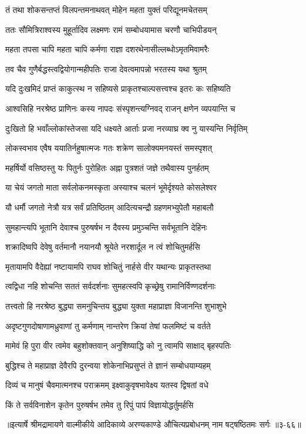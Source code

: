 
\twolineshloka
{तं तथा शोकसन्तप्तं विलपन्तमनाथवत्}
{मोहेन महता युक्तं परिद्यूनमचेतसम्} %

\twolineshloka
{ततः सौमित्रिराश्वस्य मुहूर्तादिव लक्ष्मणः}
{रामं सम्बोधयामास चरणौ चाभिपीडयन्} %

\twolineshloka
{महता तपसा चापि महता चापि कर्मणा}
{राज्ञा दशरथेनासील्लब्धोऽमृतमिवामरैः} %

\twolineshloka
{तव चैव गुणैर्बद्धस्त्वद्वियोगान्महीपतिः}
{राजा देवत्वमापन्नो भरतस्य यथा श्रुतम्} %

\twolineshloka
{यदि दुःखमिदं प्राप्तं काकुत्स्थ न सहिष्यसे}
{प्राकृतश्चाल्पसत्त्वश्च इतरः कः सहिष्यति} %

\twolineshloka
{आश्वसिहि नरश्रेष्ठ प्राणिनः कस्य नापदः}
{संस्पृशन्त्यग्निवद् राजन् क्षणेन व्यपयान्ति च} %

\twolineshloka
{दुःखितो हि भवाँल्लोकांस्तेजसा यदि धक्ष्यते}
{आर्ताः प्रजा नरव्याघ्र क्व नु यास्यन्ति निर्वृतिम्} %

\twolineshloka
{लोकस्वभाव एवैष ययातिर्नहुषात्मजः}
{गतः शक्रेण सालोक्यमनयस्तं समस्पृशत्} %

\twolineshloka
{महर्षिर्यो वसिष्ठस्तु यः पितुर्नः पुरोहितः}
{अह्ना पुत्रशतं जज्ञे तथैवास्य पुनर्हतम्} %

\twolineshloka
{या चेयं जगतो माता सर्वलोकनमस्कृता}
{अस्याश्च चलनं भूमेर्दृश्यते कोसलेश्वर} %

\twolineshloka
{यौ धर्मौ जगतो नेत्रौ यत्र सर्वं प्रतिष्ठितम्}
{आदित्यचन्द्रौ ग्रहणमभ्युपेतौ महाबलौ} %

\twolineshloka
{सुमहान्त्यपि भूतानि देवाश्च पुरुषर्षभ}
{न दैवस्य प्रमुञ्चन्ति सर्वभूतानि देहिनः} %

\twolineshloka
{शक्रादिष्वपि देवेषु वर्तमानौ नयानयौ}
{श्रूयेते नरशार्दूल न त्वं शोचितुमर्हसि} %

\twolineshloka
{मृतायामपि वैदेह्यां नष्टायामपि राघव}
{शोचितुं नार्हसे वीर यथान्यः प्राकृतस्तथा} %

\twolineshloka
{त्वद्विधा नहि शोचन्ति सततं सर्वदर्शनाः}
{सुमहत्स्वपि कृच्छ्रेषु रामानिर्विण्णदर्शनाः} %

\twolineshloka
{तत्त्वतो हि नरश्रेष्ठ बुद्ध्या समनुचिन्तय}
{बुद्ध्या युक्ता महाप्राज्ञा विजानन्ति शुभाशुभे} %

\twolineshloka
{अदृष्टगुणदोषाणामध्रुवाणां तु कर्मणाम्}
{नान्तरेण क्रियां तेषां फलमिष्टं च वर्तते} %

\twolineshloka
{मामेवं हि पुरा वीर त्वमेव बहुशोक्तवान्}
{अनुशिष्याद्धि को नु त्वामपि साक्षाद् बृहस्पतिः} %

\twolineshloka
{बुद्धिश्च ते महाप्राज्ञ देवैरपि दुरन्वया}
{शोकेनाभिप्रसुप्तं ते ज्ञानं सम्बोधयाम्यहम्} %

\twolineshloka
{दिव्यं च मानुषं चैवमात्मनश्च पराक्रमम्}
{इक्ष्वाकुवृषभावेक्ष्य यतस्व द्विषतां वधे} %

\twolineshloka
{किं ते सर्वविनाशेन कृतेन पुरुषर्षभ}
{तमेव तु रिपुं पापं विज्ञायोद्धर्तुमर्हसि} %


॥इत्यार्षे श्रीमद्रामायणे वाल्मीकीये आदिकाव्ये अरण्यकाण्डे औचित्यप्रबोधनम् नाम षट्षष्ठितमः सर्गः ॥३-६६॥
